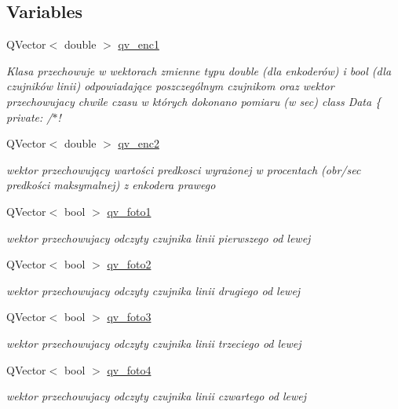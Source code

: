 \subsection*{Variables}
\begin{DoxyCompactItemize}
\item 
Q\+Vector$<$ double $>$ \hyperlink{data_8hh_a1d99d52705e631ab042251a4a9fefbc5}{qv\+\_\+enc1}
\begin{DoxyCompactList}\small\item\em Klasa przechowuje w wektorach zmienne typu double (dla enkoderów) i bool (dla czujników linii) odpowiadające poszczególnym czujnikom oraz wektor przechowujacy chwile czasu w których dokonano pomiaru (w sec) class Data \{ private\+: /$\ast$! \end{DoxyCompactList}\item 
Q\+Vector$<$ double $>$ \hyperlink{data_8hh_a27197c526976a0915f076136a315fa97}{qv\+\_\+enc2}
\begin{DoxyCompactList}\small\item\em wektor przechowujący wartości predkosci wyrażonej w procentach (obr/sec predkości maksymalnej) z enkodera prawego \end{DoxyCompactList}\item 
Q\+Vector$<$ bool $>$ \hyperlink{data_8hh_a4c943bbf0a28f870f94a6967ca60a02e}{qv\+\_\+foto1}
\begin{DoxyCompactList}\small\item\em wektor przechowujacy odczyty czujnika linii pierwszego od lewej \end{DoxyCompactList}\item 
Q\+Vector$<$ bool $>$ \hyperlink{data_8hh_a11ca3b0ceef174cba212b38ef96a990d}{qv\+\_\+foto2}
\begin{DoxyCompactList}\small\item\em wektor przechowujacy odczyty czujnika linii drugiego od lewej \end{DoxyCompactList}\item 
Q\+Vector$<$ bool $>$ \hyperlink{data_8hh_a56f915a25afd677d0f17d41aa51f766e}{qv\+\_\+foto3}
\begin{DoxyCompactList}\small\item\em wektor przechowujacy odczyty czujnika linii trzeciego od lewej \end{DoxyCompactList}\item 
Q\+Vector$<$ bool $>$ \hyperlink{data_8hh_a3a8728d84ddfb363ef1dbd0e9b4e86f9}{qv\+\_\+foto4}
\begin{DoxyCompactList}\small\item\em wektor przechowujacy odczyty czujnika linii czwartego od lewej \end{DoxyCompactList}\item 

\end{DoxyCompactItemize}
